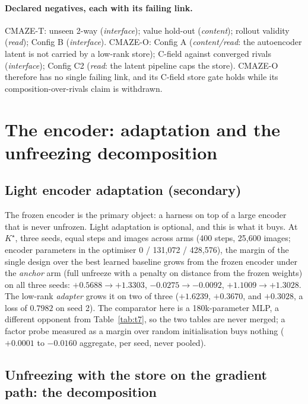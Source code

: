 \documentclass{article} %
\newcommand{\Kstar}{\ensuremath{K^{\star}}}
\begin{document}
\paragraph{Declared negatives, each with its failing link.} CMAZE-T: unseen 2-way
(\emph{interface}); value hold-out (\emph{content}); rollout validity (\emph{read}); Config B
(\emph{interface}). CMAZE-O: Config A (\emph{content/read}: the autoencoder latent is not carried by
a low-rank store); C-field against converged rivals (\emph{interface}); Config C2 (\emph{read}: the
latent pipeline caps the store). CMAZE-O therefore has no single failing link, and its C-field
store gate holds while its composition-over-rivals claim is withdrawn.

\section{The encoder: adaptation and the unfreezing decomposition}
\label{app:encoder-main}

\subsection*{Light encoder adaptation (secondary)}

The frozen encoder is the primary object: a harness on top of a large encoder that is never
unfrozen. Light adaptation is optional, and this is what it buys. At $\Kstar$, three seeds,
equal steps and images across arms (400 steps, 25,600 images; encoder parameters in the
optimiser 0 / 131,072 / 428,576), the margin of the single design over the best learned
baseline grows from the frozen encoder under the \emph{anchor} arm (full unfreeze with a
penalty on distance from the frozen weights) on all three seeds: $+0.5688\to+1.3303$,
$-0.0275\to-0.0092$, $+1.1009\to+1.3028$. The low-rank \emph{adapter} grows it on two of
three ($+1.6239$, $+0.3670$, and $+0.3028$, a loss of $0.7982$ on seed 2).
The comparator here is a 180k-parameter MLP, a different opponent from Table~\ref{tab:t7}, so
the two tables are never merged; a factor probe measured as a margin over random
initialisation buys nothing ($+0.0001$ to $-0.0160$ aggregate, per seed, never pooled).

\subsection*{Unfreezing with the store on the gradient path: the decomposition}
\end{document}
